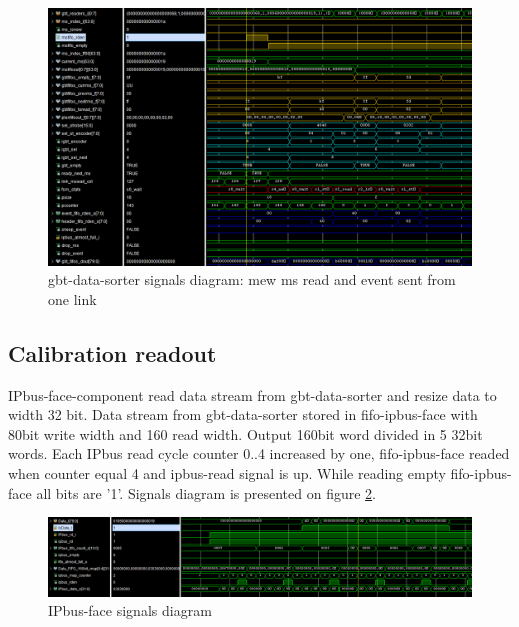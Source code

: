 \documentclass{article}
\begin{document}
\begin{figure}[H]
	\centering 
	\includegraphics[width=1.0\textwidth]{gbt-sorter-waves.png}
	\caption{\label{fig:10} gbt-data-sorter signals diagram: mew ms read and event sent from one link }
\end{figure}
















\subsection{Calibration readout}
IPbus-face-component read data stream from gbt-data-sorter and resize data to width 32 bit. Data stream from gbt-data-sorter stored in fifo-ipbus-face with 80bit write width and 160 read width. Output 160bit word divided in 5 32bit words. Each IPbus read cycle counter 0..4 increased by one, fifo-ipbus-face readed when counter equal 4 and ipbus-read signal is up. While reading empty fifo-ipbus-face all bits are '1'. Signals diagram is presented on figure \ref{fig:11}.

\begin{figure}[H]
	\centering 
	\includegraphics[width=1.0\textwidth]{ipbus-face-waves.png}
	\caption{\label{fig:11} IPbus-face signals diagram }
\end{figure}
\end{document}
